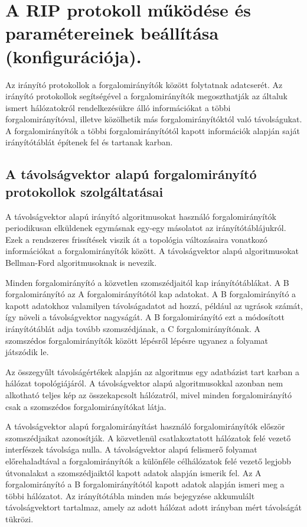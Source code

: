 \section{A RIP protokoll működése és paramétereinek beállítása (konfigurációja).}
Az irányító protokollok a forgalomirányítók között folytatnak adatcserét. Az irányító protokollok segítségével a forgalomirányítók megoszthatják az általuk ismert hálózatokról rendelkezésükre álló információkat a többi forgalomirányítóval, illetve közölhetik más forgalomirányítóktól való távolságukat. A forgalomirányítók a többi forgalomirányítótól kapott információk alapján saját irányítótáblát építenek fel és tartanak karban.

\subsection{A távolságvektor alapú forgalomirányító protokollok szolgáltatásai}
A távolságvektor alapú irányító algoritmusokat használó forgalomirányítók periodikusan elküldenek egymásnak egy-egy másolatot az irányítótáblájukról. Ezek a rendszeres frissítések viszik át a topológia változásaira vonatkozó információkat a forgalomirányítók között. A távolságvektor alapú algoritmusokat Bellman-Ford algoritmusoknak is nevezik.

Minden forgalomirányító a közvetlen szomszédjaitól kap irányítótáblákat. A B forgalomirányító az A forgalomirányítótól kap adatokat. A B forgalomirányító a kapott adatokhoz valamilyen távolságadatot ad hozzá, például az ugrások számát, így növeli a távolságvektor nagyságát. A B forgalomirányító ezt a módosított irányítótáblát adja tovább szomszédjának, a C forgalomirányítónak. A szomszédos forgalomirányítók között lépésről lépésre ugyanez a folyamat játszódik le.

Az összegyűlt távolságértékek alapján az algoritmus egy adatbázist tart karban a hálózat topológiájáról. A távolságvektor alapú algoritmusokkal azonban nem alkotható teljes kép az összekapcsolt hálózatról, mivel minden forgalomirányító csak a szomszédos forgalomirányítókat látja.

A távolságvektor alapú forgalomirányítást használó forgalomirányítók először szomszédjaikat azonosítják. A közvetlenül csatlakoztatott hálózatok felé vezető interfészek távolsága nulla. A távolságvektor alapú felismerő folyamat előrehaladtával a forgalomirányítók a különféle célhálózatok felé vezető legjobb útvonalakat a szomszédjaiktól kapott adatok alapján ismerik fel. Az A forgalomirányító a B forgalomirányítótól kapott adatok alapján ismeri meg a többi
hálózatot. Az irányítótábla minden más bejegyzése akkumulált távolságvektort tartalmaz, amely az adott hálózat adott irányban mért távolságát tükrözi.

